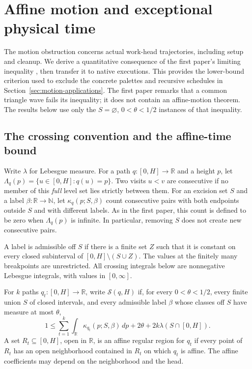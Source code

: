 \section{Affine motion and exceptional physical time}
\label{sec:motion}

The motion obstruction concerns actual work-head trajectories, including
setup and cleanup.  We derive a quantitative consequence of the first paper's
limiting inequality \cite{FirstPaper2026}, then transfer it to native
executions.  This provides the lower-bound criterion used to exclude the
concrete palettes and recursive schedules in Section~\ref{sec:motion-applications}.
The first paper remarks that a common triangle wave fails its inequality;
it does not contain an affine-motion theorem.  The results below use only
the $S=\varnothing$, $0<\theta<1/2$ instances of that inequality.

\subsection{The crossing convention and the affine-time bound}

Write $\lambda$ for Lebesgue measure.  For a path $q:[0,H]\to\mathbb R$ and a
height $p$, let $\Lambda_q(p)=\{u\in[0,H]:q(u)=p\}$.  Two visits $u<v$ are
consecutive if no member of this \emph{full} level set lies strictly between
them.  For an excision set $S$ and a label $\beta:\mathbb R\to\mathbb N$, let
$\kappa_q(p;S,\beta)$ count consecutive pairs with both endpoints outside $S$
and with different labels.  As in the first paper, this count is defined to
be zero when $\Lambda_q(p)$ is infinite.  In particular, removing $S$ does not
create new consecutive pairs.

A label is admissible off $S$ if there is a finite set $Z$ such that it is
constant on every closed subinterval of $[0,H]\setminus(S\cup Z)$.  The values
at the finitely many breakpoints are unrestricted.  All crossing integrals
below are nonnegative Lebesgue integrals, with values in $[0,\infty]$.

\begin{definition}
\label{def:motion-star}
For $k$ paths $q_t:[0,H]\to\mathbb R$, write $\mathcal S(q,H)$ if, for every
$0<\theta<1/2$, every finite union $S$ of closed intervals, and every admissible
label $\beta$ whose classes off $S$ have measure at most $\theta$,
\begin{equation}
\label{eq:motion-star}
  1\le \sum_{t=1}^k\int_{\mathbb R}\kappa_{q_t}(p;S,\beta)\,dp
       +2\theta+2k\lambda(S\cap[0,H]).
\end{equation}
A set $R_t\subseteq[0,H]$, open in $\mathbb R$, is an affine regular region
for $q_t$ if every point of $R_t$ has an open neighborhood contained in $R_t$
on which $q_t$ is affine.  The affine coefficients may depend on the
neighborhood and the head.
\end{definition}

